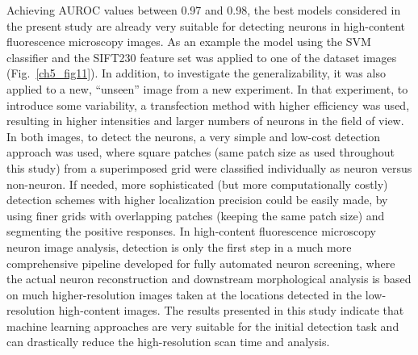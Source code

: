 Achieving AUROC values between 0.97 and 0.98, the best models considered in the present study are already very suitable for detecting neurons in high-content fluorescence microscopy images. As an example the model using the SVM classifier and the SIFT230 feature set was applied to one of the dataset images (Fig.~\ref{ch5_fig11}). In addition, to investigate the generalizability, it was also applied to a new, ``unseen'' image from a new experiment. In that experiment, to introduce some variability, a transfection method with higher efficiency \cite{bredenbeek1993sindbis} was used, resulting in higher intensities and larger numbers of neurons in the field of view. In both images, to detect the neurons, a very simple and low-cost detection approach was used, where square patches (same patch size as used throughout this study) from a superimposed grid were classified individually as neuron versus non-neuron. If needed, more sophisticated (but more computationally costly) detection schemes with higher localization precision could be easily made, by using finer grids with overlapping patches (keeping the same patch size) and segmenting the positive responses. In high-content fluorescence microscopy neuron image analysis, detection is only the first step in a much more comprehensive pipeline developed for fully automated neuron screening, where the actual neuron reconstruction and downstream morphological analysis is based on much higher-resolution images taken at the locations detected in the low-resolution high-content images. The results presented in this study indicate that machine learning approaches are very suitable for the initial detection task and can drastically reduce the high-resolution scan time and analysis.